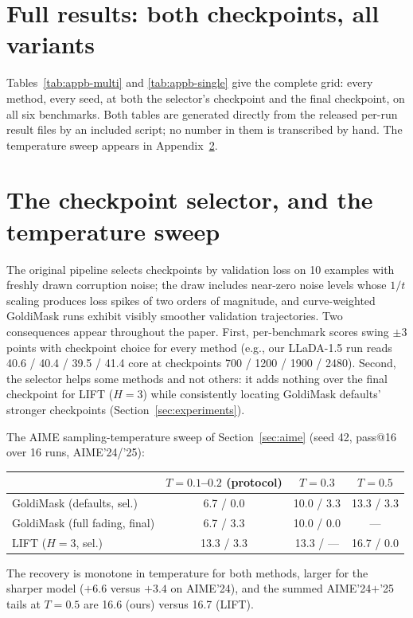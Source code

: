 \documentclass{article} %
\begin{document}
\section{Full results: both checkpoints, all variants}
\label{app:full}
Tables~\ref{tab:appb-multi} and \ref{tab:appb-single} give the complete grid: every method, every seed, at both the selector's checkpoint and the final checkpoint, on all six benchmarks. Both tables are generated directly from the released per-run result files by an included script; no number in them is transcribed by hand. The temperature sweep appears in Appendix~\ref{app:selector}.



\section{The checkpoint selector, and the temperature sweep}
\label{app:selector}
The original pipeline selects checkpoints by validation loss on 10 examples with freshly drawn corruption noise; the draw includes near-zero noise levels whose $1/t$ scaling produces loss spikes of two orders of magnitude, and curve-weighted GoldiMask runs exhibit visibly smoother validation trajectories. Two consequences appear throughout the paper. First, per-benchmark scores swing $\pm 3$ points with checkpoint choice for every method (e.g., our LLaDA-1.5 run reads 40.6 / 40.4 / 39.5 / 41.4 core at checkpoints 700 / 1200 / 1900 / 2480). Second, the selector helps some methods and not others: it adds nothing over the final checkpoint for LIFT ($H{=}3$) while consistently locating GoldiMask defaults' stronger checkpoints (Section~\ref{sec:experiments}).

The AIME sampling-temperature sweep of Section~\ref{sec:aime} (seed 42, pass@16 over 16 runs, AIME'24/'25):

\begin{center}
\begin{tabular}{lccc}
\toprule
 & $T{=}0.1$--$0.2$ (protocol) & $T{=}0.3$ & $T{=}0.5$ \\
\midrule
GoldiMask (defaults, sel.)   & 6.7 / 0.0 & 10.0 / 3.3 & 13.3 / 3.3 \\
GoldiMask (full fading, final) & 6.7 / 3.3 & 10.0 / 0.0 & --- \\
LIFT ($H{=}3$, sel.)         & 13.3 / 3.3 & 13.3 / --- & 16.7 / 0.0 \\
\bottomrule
\end{tabular}
\end{center}

The recovery is monotone in temperature for both methods, larger for the sharper model ($+6.6$ versus $+3.4$ on AIME'24), and the summed AIME'24$+$'25 tails at $T{=}0.5$ are 16.6 (ours) versus 16.7 (LIFT).
\end{document}
